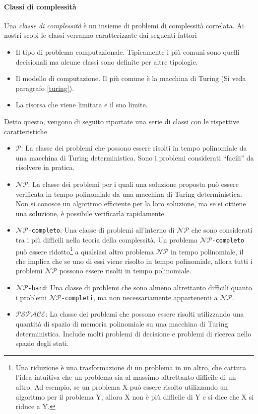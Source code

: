 \documentclass{article}
\theoremstyle{definition}
\begin{document}
\paragraph{Classi di complessità}
Una \emph{classe di complessità} è un insieme di problemi di complessità correlata. Ai nostri scopi le classi verranno caratterizzate dai seguenti fattori
\begin{itemize}
    \item Il tipo di problema computazionale. Tipicamente i più comuni sono quelli decisionali ma alcune classi sono definite per altre tipologie.
    \item Il modello di computazione. Il più comune è la macchina di Turing (Si veda paragrafo \ref{turing}).
    \item La risorsa che viene limitata e il suo limite.
\end{itemize}
Detto questo, vengono di seguito riportate una serie di classi con le rispettive caratteristiche
\begin{itemize}
    \item \texttt{$\mathcal{P}$}: La classe dei problemi che possono essere risolti in tempo polinomiale da una macchina di Turing deterministica. Sono i problemi considerati ``facili'' da risolvere in pratica. 
    \item \texttt{$\mathcal{NP}$}: La classe dei problemi per i quali una soluzione proposta può essere verificata in tempo polinomiale da una macchina di Turing deterministica. Non si conosce un algoritmo efficiente per la loro soluzione, ma se si ottiene una soluzione, è possibile verificarla rapidamente.
    \item \texttt{$\mathcal{NP}$-completo}: Una classe di problemi all'interno di \texttt{$\mathcal{NP}$} che sono considerati tra i più difficili nella teoria della complessità. Un problema \texttt{$\mathcal{NP}$-completo} può essere ridotto\footnote{Una riduzione è una trasformazione di un problema in un altro, che cattura l'idea intuitiva che un problema sia al massimo altrettanto difficile di un altro. Ad esempio, se un problema X può essere risolto utilizzando un algoritmo per il problema Y, allora X non è più difficile di Y e si dice che X si riduce a Y.} a qualsiasi altro problema \texttt{$\mathcal{NP}$} in tempo polinomiale, il che implica che se uno di essi viene risolto in tempo polinomiale, allora tutti i problemi \texttt{$\mathcal{NP}$} possono essere risolti in tempo polinomiale.
    \item \texttt{$\mathcal{NP}$-hard}: Una classe di problemi che sono almeno altrettanto difficili quanto i problemi \texttt{$\mathcal{NP}$-completi}, ma non necessariamente appartenenti a \texttt{$\mathcal{NP}$}. 
    \item \texttt{$\mathcal{PSPACE}$}: La classe dei problemi che possono essere risolti utilizzando una quantità di spazio di memoria polinomiale su una macchina di Turing deterministica. Include molti problemi di decisione e problemi di ricerca nello spazio degli stati.
\end{itemize}
\end{document}

